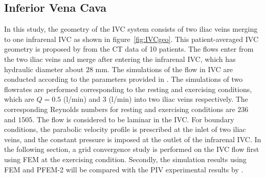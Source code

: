 \subsection{Inferior Vena Cava}

In this study, the geometry of the IVC system consists of two iliac veins merging to one infrarenal IVC as shown in figure~\ref{fig:IVCgeo}. This patient-averaged IVC geometry is proposed by \cite{gallagher_exp} from the CT data of 10 patients. The flows enter from the two iliac veins and merge after entering the infrarenal IVC, which has hydraulic diameter about $28$ mm. 
The simulations of the flow in IVC are conducted according to the parameters provided in \cite{craven_cfd}. The simulations of two flowrates are performed corresponding to the resting and exercising conditions, which are $Q= 0.5$ (l/min) and $3$ (l/min) into two iliac veins respectively. The corresponding Reynolds numbers for resting and exercising conditions are $236$ and $1505$. The flow is considered to be laminar in the IVC. For boundary conditions, the parabolic velocity profile is prescribed at the inlet of two iliac veins, and the constant pressure is imposed at the outlet of the infrarenal IVC.
In the following section, a grid convergence study is performed on the IVC flow first using FEM at the exercising condition. Secondly, the simulation results using FEM and PFEM-2 will be compared with the PIV experimental results by \cite{gallagher_exp}. 

